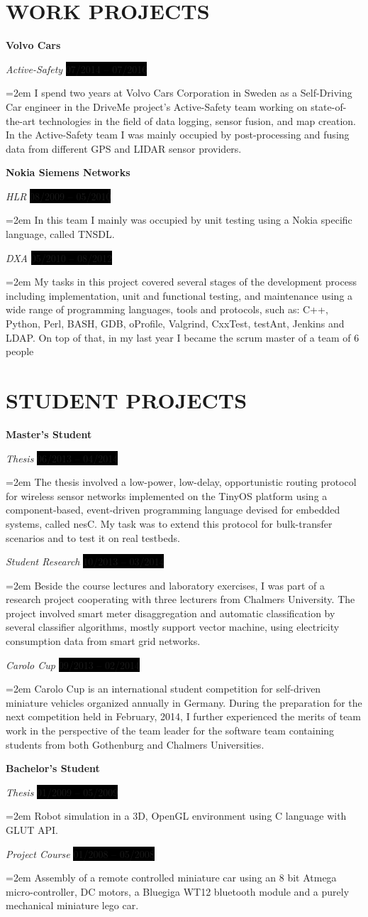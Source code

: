 \documentclass[paper=a4,fontsize=11pt]{scrartcl}	 			%
\newcommand{\sepspace}{\vspace*{1em}}			%
\newcommand{\NewPart}[1]{\section*{\uppercase{#1}}}
\newcommand{\EducationEntry}[4]{
		\noindent \textbf{#1} \par 					%
		\noindent \textit{#3} \hfill					%
		\colorbox{Black}{%
			\hfill\color{White}#2} \par				%
		\noindent\hangindent=2em\hangafter=0 \small #4 	%
		\normalsize \par
    }
\begin{document}
\NewPart{Work Projects}{}

\EducationEntry{Volvo Cars}{07/2014 -- 07/2016}{Active-Safety}{I spend two years at Volvo Cars Corporation in Sweden as a Self-Driving Car engineer in the DriveMe project's Active-Safety team working on state-of-the-art technologies in the field of data logging, sensor fusion, and map creation. In the Active-Safety team I was mainly occupied by post-processing and fusing data from different GPS and LIDAR sensor providers.}

\sepspace

\EducationEntry{Nokia Siemens Networks}{08/2009 -- 05/2010}{HLR}{In this team I mainly was occupied by unit testing using a Nokia specific language, called TNSDL.}

\EducationEntry{}{05/2010 -- 08/2012}{DXA}{My tasks in this project covered several stages of the development process including implementation, unit and functional testing, and maintenance using a wide range of programming languages, tools and protocols, such as: C++, Python, Perl, BASH, GDB, oProfile, Valgrind, CxxTest, testAnt, Jenkins and LDAP. On top of that, in my last year I became the scrum master of a team of 6 people}

\NewPart{Student Projects}{}

\EducationEntry{Master's Student}{06/2013 -- 04/2014}{Thesis}{The thesis involved a low-power, low-delay, opportunistic routing protocol for wireless sensor networks implemented on the TinyOS platform using a component-based, event-driven programming language devised for embedded systems, called nesC. My task was to extend this protocol for bulk-transfer scenarios and to test it on real testbeds.}
\EducationEntry{}{10/2013 -- 03/2014}{Student Research}{Beside the course lectures and laboratory exercises, I was part of a research project cooperating with three lecturers from Chalmers University. The project involved smart meter disaggregation and automatic classification by several classifier algorithms, mostly support vector machine, using electricity consumption data from smart grid networks.}
\EducationEntry{}{09/2013 -- 02/2014}{Carolo Cup}{Carolo Cup is an international student competition for self-driven miniature vehicles organized annually in Germany. During the preparation for the next competition held in February, 2014, I further experienced the merits of team work in the perspective of the team leader for the software team containing students from both Gothenburg and Chalmers Universities.}
\sepspace
\EducationEntry{Bachelor's Student}{01/2009 -- 05/2009}{Thesis}{Robot simulation in a 3D, OpenGL environment using C language with GLUT API.}
\EducationEntry{}{01/2008 -- 05/2008}{Project Course}{Assembly of a remote controlled miniature car using an 8 bit Atmega micro-controller, DC motors, a Bluegiga WT12 bluetooth module and a purely mechanical miniature lego car.}
\end{document}
